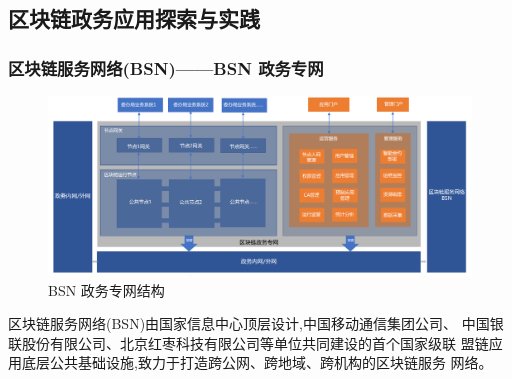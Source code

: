 \documentclass[11pt]{beamer}
\begin{document}
\subsection{区块链政务应用探索与实践}
\begin{frame}
	\frametitle{区块链服务网络(BSN)——BSN 政务专网}
	\begin{figure}
		\centering
		\includegraphics[width=0.7\linewidth]{figures/gov/6}
		\caption{BSN 政务专网结构}
		\label{fig:6}
	\end{figure}
	
区块链服务网络(BSN)由国家信息中心顶层设计,中国移动通信集团公司、
中国银联股份有限公司、北京红枣科技有限公司等单位共同建设的首个国家级联
盟链应用底层公共基础设施,致力于打造跨公网、跨地域、跨机构的区块链服务
网络。
\end{frame}
\end{document}
